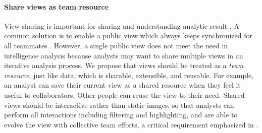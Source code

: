 \paragraph{Share views as team resource}

View sharing is important for sharing and understanding analytic result \cite{Morton2014a}. A common solution is to enable a public view which always keeps synchronized for all teammates \cite{Convertino2011,Greenberg1990}. However, a single public view does not meet the need in intelligence analysis because analysts may want to share multiple views in an iterative analysis process.
We propose that views should be treated as a
\emph{team resource}, just like data, which is sharable,
extensible, and reusable. For example, an analyst can save their current view as a shared resource when
they feel it useful to collaborators. Other people can reuse the view
to their need. Shared views should be interactive rather than static
images, so that analysts can perform all interactions including
filtering and highlighting, and are able to evolve the view with
collective team efforts, a critical requirement emphasized in
\cite{Carroll2013}.
